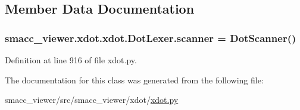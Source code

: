 \subsection{Member Data Documentation}
\subsubsection[{\texorpdfstring{scanner}{scanner}}]{\setlength{\rightskip}{0pt plus 5cm}smacc\+\_\+viewer.\+xdot.\+xdot.\+Dot\+Lexer.\+scanner = {\bf Dot\+Scanner}()\hspace{0.3cm}{\ttfamily [static]}}\hypertarget{classsmacc__viewer_1_1xdot_1_1xdot_1_1DotLexer_a48e3b43320865076a9a2924d217d8c23}{}\label{classsmacc__viewer_1_1xdot_1_1xdot_1_1DotLexer_a48e3b43320865076a9a2924d217d8c23}


Definition at line 916 of file xdot.\+py.



The documentation for this class was generated from the following file\+:\begin{DoxyCompactItemize}
\item 
smacc\+\_\+viewer/src/smacc\+\_\+viewer/xdot/\hyperlink{xdot_8py}{xdot.\+py}\end{DoxyCompactItemize}
